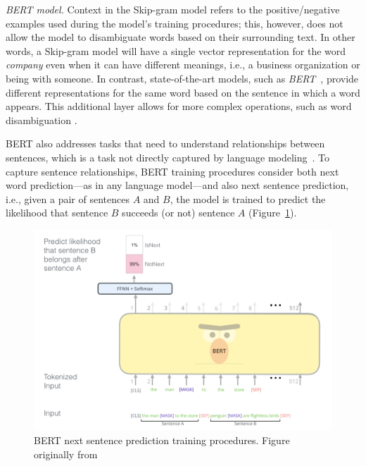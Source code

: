 \medskip
\begin{hangparas}{.0in}{0}
     \textit{BERT model.} Context in the Skip-gram model refers to the positive/negative examples used during the model's training procedures; this, however, does not allow the model to disambiguate words based on their surrounding text. In other words, a Skip-gram model will have a single vector representation for the word \textit{company} even when it can have different meanings, i.e., a business organization or being with someone. In contrast, state-of-the-art models, such as \textit{BERT}~\cite{Devlin2018Bert}, provide different representations for the same word based on the sentence in which a word appears.
    This additional layer allows for more complex operations, such as word disambiguation .
\end{hangparas}



BERT also addresses tasks that need to understand relationships between sentences, which is a task not directly captured by language modeling~\cite{Devlin2018Bert}. 
To capture sentence relationships, BERT training procedures consider both next word prediction---as in any language model---and also next sentence prediction, i.e., given a pair of sentences $A$ and $B$, the model 
is trained to predict the likelihood that sentence $B$ succeeds (or not) sentence $A$ (Figure~\ref{fig:BERT}). 


\begin{figure}
    \centering
    \includegraphics[width=.75\linewidth]{fig/cp5/BERT}
    \caption{BERT next sentence prediction training procedures. Figure originally from~\cite{jay-alammar-bert}  }
    \label{fig:BERT}
\end{figure}



